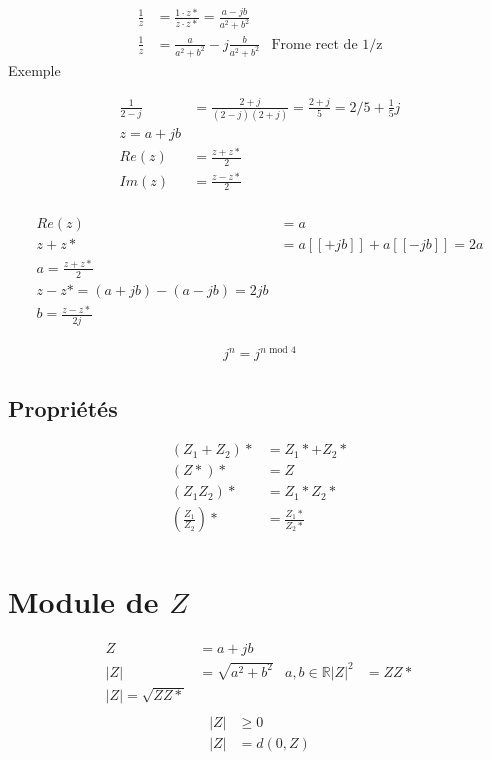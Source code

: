 \documentclass[a4paper,11pt]{report}
\begin{document}
\begin{align}
   \frac{1}{z} &= \frac{1 \cdot z*}{z\cdot z*} = \frac{ a-jb}{a^2+b^2} \\
   \frac{1}{z} &= \frac{a}{a^2 + b^2} - j\frac{b}{a^2+b^2} & \text{Frome rect de 1/z}
\end{align}
Exemple

\begin{align}
   \frac{1}{2-j} &= \frac{2+j}{(2-j)(2+j)} = \frac{2+j}{5} = 2/5 + \frac{1}{5} j \\
   z = a+jb\\
   Re(z) &= \frac{z + z*}{2} \\
   Im(z) &= \frac{z-z*}{2} \\
\end{align}

\begin{align}
   Re(z) &= a\\
   z + z* &= a [[+jb]] + a [[ -jb]] = 2a \\
   a = \frac{z+z*}{2} \\
   z-z* = (a+jb)- (a-jb) = 2jb \\
   b = \frac{z-z*}{2j}
\end{align}

\begin{align}
   j^n = j^{n \text{ mod } 4}
\end{align}

\subsection{Propriétés}
\begin{align}
   (Z_1 + Z_2)* &= Z_1* + Z_2* \\
   (Z*)* &= Z \\
   (Z_1Z_2)* &= Z_1* Z_2* \\
   \left(\frac{Z_1}{Z_2}\right)* &= \frac{Z_1*}{Z_2*} \\
\end{align}

\section{Module de $Z$}
\begin{align*}
   Z &= a+jb \\
   |Z| &= \sqrt{a^2+b^2} & a,b ∈ ℝ
   |Z|^2 &= ZZ* \\
   |Z| = \sqrt{ZZ*} \\
\end{align*}
\begin{align*}
   |Z| &\geqslant 0 \\
   |Z| &= d(0,Z) \\
\end{align*}
\end{document}

